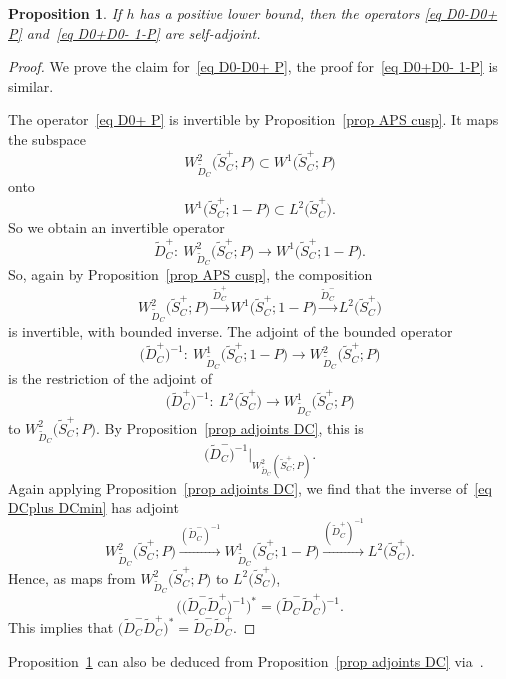 \documentclass[pdftex]{sigma}%
\numberwithin{equation}{section}
\newtheorem{Proposition}[Theorem]{Proposition}
 { \theoremstyle{definition}
\newtheorem{Definition}[Theorem]{Definition}
\newtheorem{Note}[Theorem]{Note}
\newtheorem{Example}[Theorem]{Example}
\newtheorem{Remark}[Theorem]{Remark} }
\begin{document}
\begin{Proposition}\label{prop DC2 sa}
If $h$ has a positive lower bound, then the operators
\eqref{eq D0-D0+ P} and~\eqref{eq D0+D0- 1-P}
are self-adjoint.
\end{Proposition}
\begin{proof}
We prove the claim for~\eqref{eq D0-D0+ P}, the proof for~\eqref{eq D0+D0- 1-P} is similar.

The operator~\eqref{eq D0+ P} is invertible by Proposition~\ref{prop APS cusp}. It maps the subspace
\[
W^2_{\widetilde{D}_C}\big(\widetilde{S}_C^+; P\big) \subset W^1\big(\widetilde{S}_C^+; P\big)
\]
onto
\[
W^1\big(\widetilde{S}_C^+; 1-P\big) \subset L^2\big(\widetilde{S}_C^+\big).
\]
 So we obtain an invertible operator
\begin{equation*} %
\widetilde{D}_C^+\colon\ W^2_{\widetilde{D}_C}\big(\widetilde{S}_C^+; P\big) \to W^1\big(\widetilde{S}_C^+; 1-P\big).
\end{equation*}
So, again by Proposition~\ref{prop APS cusp}, the composition
\begin{equation} \label{eq DCplus DCmin}
W^2_{\widetilde{D}_C}\big(\widetilde{S}_C^+; P\big) \xrightarrow{\widetilde{D}_C^+} W^1\big(\widetilde{S}_C^+; 1-P\big)\xrightarrow{\widetilde{D}_C^-} L^2\big(\widetilde{S}_C^+\big)
\end{equation}
is invertible, with bounded inverse. The adjoint of the bounded operator
\[
\big(\widetilde{D}_C^+\big)^{-1}\colon\
W^1_{\widetilde{D}_C}\big(\widetilde{S}_C^+; 1-P\big)\to W^2_{\widetilde{D}_C}\big(\widetilde{S}_C^+; P\big)
\]
is the restriction of the adjoint of
\[
\big(\widetilde{D}_C^+\big)^{-1}\colon\ L^2\big(\widetilde{S}_C^+\big)\to W^1_{\widetilde{D}_C}\big(\widetilde{S}_C^+; P\big)
\]
to $W^2_{\widetilde{D}_C}\big(\widetilde{S}_C^+; P\big)$.
By Proposition~\ref{prop adjoints DC}, this is
\[
 \big(\widetilde{D}_C^-\big)^{-1}|_{W^2_{\widetilde{D}_C}(\widetilde{S}_C^+; P) }.
\]
Again applying Proposition~\ref{prop adjoints DC}, we find that the inverse of~\eqref{eq DCplus DCmin} has adjoint
\[
W^2_{\widetilde{D}_C}\big(\widetilde{S}_C^+; P\big) \xrightarrow{ (\widetilde{D}_C^-)^{-1}} W^1_{\widetilde{D}_C}\big(\widetilde{S}_C^+; 1-P\big)\xrightarrow{(\widetilde{D}_C^+)^{-1}} L^2\big(\widetilde{S}_C^+\big).
\]
Hence, as maps from $W^2_{\widetilde{D}_C}\big(\widetilde{S}_C^+; P\big)$ to $L^2\big(\widetilde{S}_C^+\big)$,
\[
\big(\big(\widetilde{D}_C^- \widetilde{D}_C^+\big)^{-1}\big)^* = \big(\widetilde{D}_C^- \widetilde{D}_C^+\big)^{-1}.
\]
This implies that $\big(\widetilde{D}_C^- \widetilde{D}_C^+\big)^* = \widetilde{D}_C^- \widetilde{D}_C^+$.
\end{proof}
\begin{Remark}
Proposition~\ref{prop DC2 sa} can also be deduced from Proposition~\ref{prop adjoints DC} via~\cite[Theorem~X.25]{RSII}.
\end{Remark}
\end{document}
